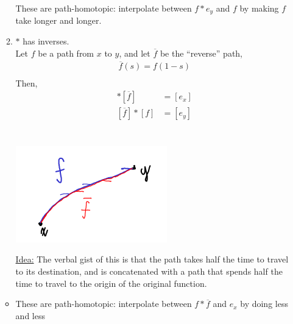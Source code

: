 \begin{itemize}
\begin{enumerate}
\begin{minipage}[c]{\linewidth}
\begin{center}
                        \end{center}
                    \end{minipage}
                    These are path-homotopic: interpolate between $f*e_y$ and $f$ by making
                    $f$ take longer and longer.
                \item $*$ has inverses.\\
                    Let $f$ be a path from $x$ to $y$, and let $\overline{f}$ be the ``reverse'' path,
                    \begin{align*}
                        \overline{f}(s)=f(1-s)\\
                    \end{align*}
                    Then,
                    \begin{align*}
                        [f]*[\overline{f}]&=[e_x]\\
                        [\overline{f}]*[f]&=[e_y]\\
                    \end{align*}\\
                    \begin{minipage}[c]{\linewidth}
                        \begin{center}
                            \includegraphics[]{images/path_inverse.png}
                        \end{center}
                    \end{minipage}
                    \underline{Idea:} 
                    The verbal gist of this is that the path takes half the time to travel to its destination, and
                    is concatenated with a path that spends half the time to travel to the origin of the original
                    function.\\
            \end{enumerate}
    \begin{itemize}
        \item
            These are path-homotopic: interpolate between $f*\overline{f}$ and $e_x$ by doing less and less

\end{itemize}
\end{itemize}

